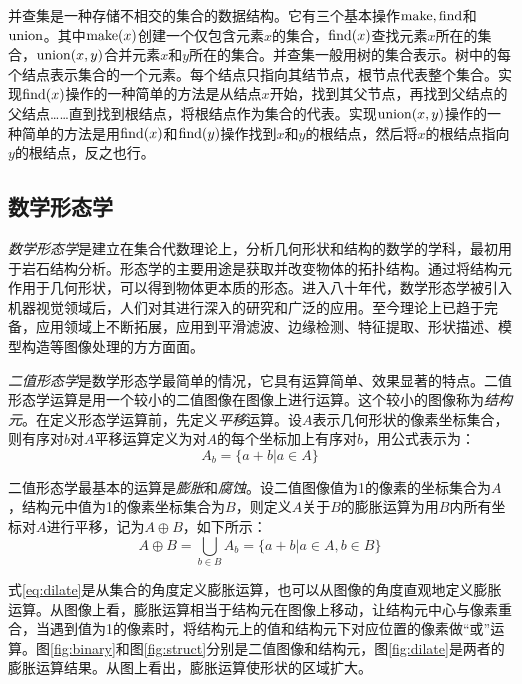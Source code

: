 并查集是一种存储不相交的集合的数据结构。它有三个基本操作$\operatorname{make},\operatorname{find}$和$\operatorname{union}$。其中$\operatorname{make}(x)$创建一个仅包含元素$x$的集合，$\operatorname{find}(x)$查找元素$x$所在的集合，$\operatorname{union}(x,y)$合并元素$x$和$y$所在的集合。并查集一般用树的集合表示。树中的每个结点表示集合的一个元素。每个结点只指向其结节点，根节点代表整个集合。实现$\operatorname{find}(x)$操作的一种简单的方法是从结点$x$开始，找到其父节点，再找到父结点的父结点……直到找到根结点，将根结点作为集合的代表。实现$\operatorname{union}(x,y)$操作的一种简单的方法是用$\operatorname{find}(x)$和$\operatorname{find}(y)$操作找到$x$和$y$的根结点，然后将$x$的根结点指向$y$的根结点，反之也行。

\subsection{数学形态学}

\emph{数学形态学}是建立在集合代数理论上，分析几何形状和结构的数学的学科，最初用于岩石结构分析。形态学的主要用途是获取并改变物体的拓扑结构。通过将结构元作用于几何形状，可以得到物体更本质的形态。进入八十年代，数学形态学被引入机器视觉领域后，人们对其进行深入的研究和广泛的应用。至今理论上已趋于完备，应用领域上不断拓展，应用到平滑滤波、边缘检测、特征提取、形状描述、模型构造等图像处理的方方面面。

\emph{二值形态学}是数学形态学最简单的情况，它具有运算简单、效果显著的特点。二值形态学运算是用一个较小的二值图像在图像上进行运算。这个较小的图像称为\emph{结构元}。在定义形态学运算前，先定义\emph{平移}运算。设$A$表示几何形状的像素坐标集合，则有序对$b$对$A$平移运算定义为对$A$的每个坐标加上有序对$b$，用公式表示为：
\begin{equation}
  \label{eq:shift}
  A_b=\{a+b|a\in A\}
\end{equation}

二值形态学最基本的运算是\emph{膨胀}和\emph{腐蚀}。设二值图像值为1的像素的坐标集合为$A$，结构元中值为1的像素坐标集合为$B$，则定义$A$关于$B$的膨胀运算为用$B$内所有坐标对$A$进行平移，记为$A\oplus B$，如下所示：
\begin{equation}
  \label{eq:dilate}
  A\oplus B=\bigcup_{b\in B}A_b=\{a+b|a\in A,b\in B\}
\end{equation}

式\eqref{eq:dilate}是从集合的角度定义膨胀运算，也可以从图像的角度直观地定义膨胀运算。从图像上看，膨胀运算相当于结构元在图像上移动，让结构元中心与像素重合，当遇到值为1的像素时，将结构元上的值和结构元下对应位置的像素做“或”运算。图\ref{fig:binary}和图\ref{fig:struct}分别是二值图像和结构元，图\ref{fig:dilate}是两者的膨胀运算结果。从图上看出，膨胀运算使形状的区域扩大。

